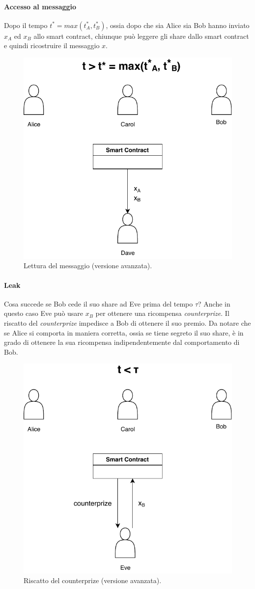\paragraph{Accesso al messaggio}
Dopo il tempo $ t^* = max(t^*_A, t^*_B) $, ossia dopo che sia Alice sia Bob
hanno inviato $ x_A $ ed $ x_B $
allo smart contract, chiunque può leggere gli share dallo smart contract e quindi
ricostruire il messaggio $ x $.
\begin{figure}[H]
	\centering
	\includegraphics[width=0.5\linewidth]{images/chap_protocollo/avanzato-leggi.pdf}
	\caption{Lettura del messaggio (versione avanzata).}
\end{figure}

\paragraph{Leak}
Cosa succede se Bob cede il suo share ad Eve prima del tempo $ \tau $?
Anche in questo caso Eve può usare $ x_B $ per ottenere una ricompensa
\textit{counterprize}.
Il riscatto del \textit{counterprize} impedisce a Bob di ottenere il suo premio.
Da notare che se Alice si comporta in maniera corretta, ossia se tiene segreto il
suo share, è in grado di ottenere la sua ricompensa indipendentemente dal comportamento
di Bob.
\begin{figure}[H]
	\centering
	\includegraphics[width=0.4\linewidth]{images/chap_protocollo/avanzato-leak-1.pdf}
	\caption{Riscatto del counterprize (versione avanzata).}
\end{figure}

